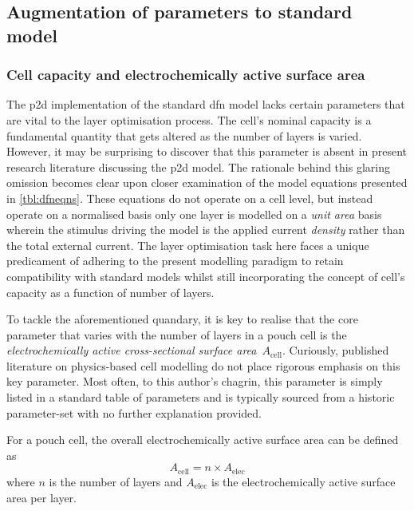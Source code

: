 
\subsection{Augmentation of parameters to standard  model}

\subsubsection*{Cell capacity and electrochemically active surface area}

The  \gls{p2d} implementation  of  the standard  \gls{dfn}  model lacks  certain
parameters that are vital to the  layer optimisation process. The cell's nominal
capacity is a fundamental quantity that gets  altered as the number of layers is
varied. However, it may be surprising  to discover that this parameter is absent
in present  research literature  discussing the  \gls{p2d} model.  The rationale
behind this glaring omission becomes clear  upon closer examination of the model
equations presented in  \cref{tbl:dfneqns}. These equations do not  operate on a
cell level, but  instead operate on a  normalised basis \ie{} only  one layer is
modelled on a  \emph{unit area} basis wherein the stimulus  driving the model is
the applied current  \emph{density} rather than the total  external current. The
layer  optimisation task  here faces  a unique  predicament of  adhering to  the
present modelling paradigm  to retain compatibility with  standard models whilst
still incorporating  the concept of cell's  capacity as a function  of number of
layers.

To  tackle the  aforementioned quandary,  it  is key  to realise  that the  core
parameter  that  varies with  the  number  of layers  in  a  pouch cell  is  the
\emph{electrochemically  active  cross-sectional surface  area}~$A_\text{cell}$.
Curiously, published  literature on  physics-based cell  modelling do  not place
rigorous emphasis on  this key parameter. Most often, to  this author's chagrin,
this  parameter is  simply  listed in  a  standard table  of  parameters and  is
typically  sourced from  a historic  parameter-set with  no further  explanation
provided.

For  a pouch  cell, the  overall electrochemically  active surface  area can  be
defined as
\begin{equation}\label{eq:overallarea}
    A_\text{cell} = n \times A_\text{elec}
\end{equation}
where $n$ is  the number of layers and $A_\text{elec}$  is the electrochemically
active surface area per layer.

